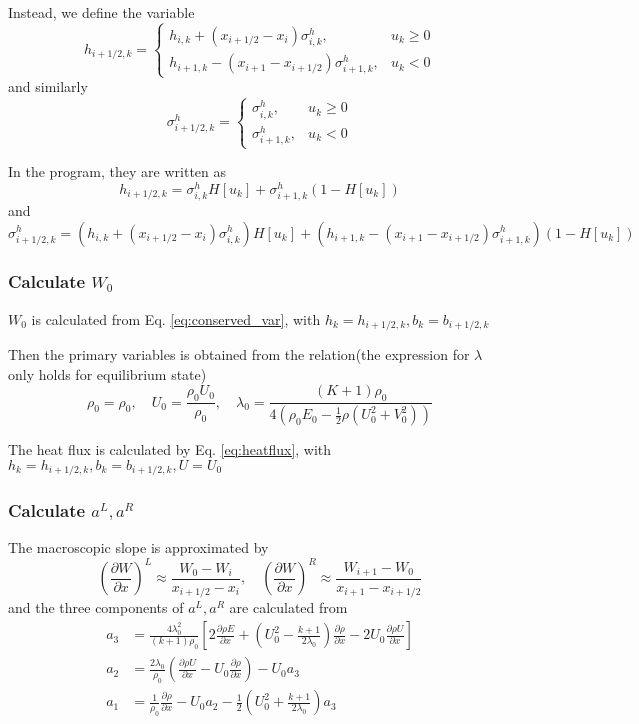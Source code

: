 \documentclass[a4paper]{book}
\begin{document}
Instead, we define the variable
$$h_{i+1/2,k} = \begin{cases} h_{i,k}+(x_{i+1/2}-x_i)\sigma_{i,k}^h, & u_k \geqslant 0\\ h_{i+1,k}-(x_{i+1}-x_{i+1/2})\sigma_{i+1,k}^h, & u_k < 0\end{cases}
$$
and similarly
$$
\sigma_{i+1/2,k}^h = \begin{cases} \sigma_{i,k}^h, & u_k \geqslant 0\\ \sigma_{i+1,k}^h, & u_k < 0\end{cases}
$$

In the program, they are written as
$$h_{i+1/2,k} =\sigma_{i,k}^h H[u_k]+\sigma_{i+1,k}^h(1-H[u_k])$$
and
$$\sigma_{i+1/2,k}^h = (h_{i,k}+(x_{i+1/2}-x_i)\sigma_{i,k}^h)H[u_k]+(h_{i+1,k}-(x_{i+1}-x_{i+1/2})\sigma_{i+1,k}^h)(1-H[u_k])$$

\subsubsection*{Calculate $W_0$}
$W_0$ is calculated from Eq. \ref{eq:conserved_var}, with $h_k=h_{i+1/2,k}, b_k=b_{i+1/2,k}$

Then the primary variables is obtained from the relation(the expression for $\lambda$ only holds for equilibrium state)
$$\rho_0 = \rho_0,\quad U_0=\frac{\rho_0 U_0}{\rho_0},\quad \lambda_0=\frac{(K+1)\rho_0}{4\left(\rho_0 E_0-\frac{1}{2}\rho(U_0^2+V_0^2)\right)}$$

The heat flux is calculated by Eq. \ref{eq:heatflux}, with $h_k=h_{i+1/2,k},b_k=b_{i+1/2,k},U=U_0$

\subsubsection*{Calculate $a^L,a^R$}
The macroscopic slope is approximated by
$$\left(\frac{\partial W}{\partial x}\right)^L\approx\frac{W_0-W_{i}}{x_{i+1/2}-x_i},\quad \left(\frac{\partial W}{\partial x}\right)^R\approx\frac{W_{i+1}-W_{0}}{x_{i+1}-x_{i+1/2}}$$
and the three components of $a^L,a^R$ are calculated from
\begin{equation} 
    \label{eq:micro_slope}
    \begin{aligned}
        a_3&=\frac{4\lambda_0^2}{(k+1)\rho_0}\left[2\frac{\partial\rho E}{\partial x}+\left(U_0^2-\frac{k+1}{2\lambda_0}\right)\frac{\partial\rho}{\partial x}-2U_0\frac{\partial\rho U}{\partial x}\right]\\
        a_2&=\frac{2\lambda_0}{\rho_0}\left(\frac{\partial\rho U}{\partial x}-U_0\frac{\partial\rho}{\partial x}\right)-U_0a_3\\
        a_1&=\frac{1}{\rho_0}\frac{\partial\rho}{\partial x}-U_0a_2-\frac{1}{2}\left(U_0^2+\frac{k+1}{2\lambda_0}\right)a_3
    \end{aligned}
\end{equation}
\end{document}
